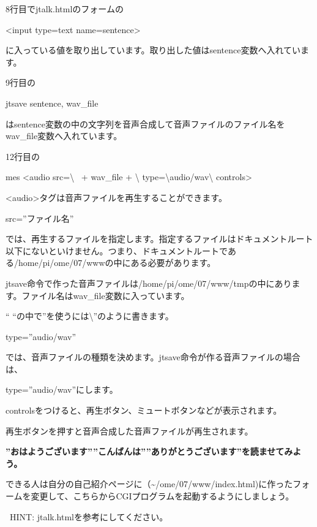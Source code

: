 \documentclass[a4paper,12pt,dvipdfmx]{jarticle}
\begin{document}
\bigskip

8行目でjtalk.htmlのフォームの

{\textless}input type={\textquotedbl}text{\textquotedbl} name={\textquotedbl}sentence{\textquotedbl}{\textgreater}

に入っている値を取り出しています。取り出した値はsentence変数へ入れています。

9行目の

jtsave sentence, wav\_file

はsentence変数の中の文字列を音声合成して音声ファイルのファイル名をwav\_file変数へ入れています。

12行目の

mes {\textquotedbl}{\textless}audio src={\textbackslash}{\textquotedbl}{\textquotedbl} \ + wav\_file +
{\textquotedbl}{\textbackslash}{\textquotedbl}
type={\textbackslash}{\textquotedbl}audio/wav{\textbackslash}{\textquotedbl} controls{\textgreater}{\textquotedbl}

{\textless}audio{\textgreater}タグは音声ファイルを再生することができます。

src=”ファイル名”

では、再生するファイルを指定します。指定するファイルはドキュメントルート以下にないといけません。つまり、ドキュメントルートである/home/pi/ome/07/wwwの中にある必要があります。

jtsave命令で作った音声ファイルは/home/pi/ome/07/www/tmpの中にあります。ファイル名はwav\_file変数に入っています。

“
“の中で”を使うには{\textbackslash}”のように書きます。

type=”audio/wav”

では、音声ファイルの種類を決めます。jtsave命令が作る音声ファイルの場合は、

type=”audio/wav”にします。

controlsをつけると、再生ボタン、ミュートボタンなどが表示されます。

再生ボタンを押すと音声合成した音声ファイルが再生されます。


{\bfseries
”おはようございます””こんばんは””ありがとうございます”を読ませてみよう。}


\bigskip

できる人は自分の自己紹介ページに（\~{}/ome/07/www/index.html)に作ったフォームを変更して、こちらからCGIプログラムを起動するようにしましょう。

\ HINT: jtalk.htmlを参考にしてください。
\end{document}
